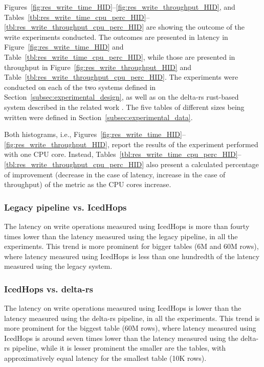 Figures~\ref{fig:res_write_time_HID}--\ref{fig:res_write_throughput_HID}, and Tables~\ref{tbl:res_write_time_cpu_perc_HID}--\ref{tbl:res_write_throughput_cpu_perc_HID} are showing the outcome of the write experiments conducted. The outcomes are presented in latency in Figure~\ref{fig:res_write_time_HID} and Table~\ref{tbl:res_write_time_cpu_perc_HID}, while those are presented in throughput in Figure~\ref{fig:res_write_throughput_HID} and Table~\ref{tbl:res_write_throughput_cpu_perc_HID}. The experiments were conducted on each of the two systems defined in Section~\ref{subsec:experimental_design}, as well as on the delta-rs rust-based system described in the related work \cite{manfrediReducingReadWrite2024}. The five tables of different sizes being written were defined in Section~\ref{subsec:experimental_data}.

Both histograms, i.e., Figures~\ref{fig:res_write_time_HID}--\ref{fig:res_write_throughput_HID}, report the results of the experiment performed with one \gls{CPU} core. Instead, Tables~\ref{tbl:res_write_time_cpu_perc_HID}--\ref{tbl:res_write_throughput_cpu_perc_HID} also present a calculated percentage of improvement (decrease in the case of latency, increase in the case of throughput) of the metric as the \gls{CPU} cores increase.

\subsubsection*{Legacy pipeline vs. IcedHops}
The latency on write operations measured using IcedHops is more than fourty times lower than the latency measured using the legacy pipeline, in all the experiments. This trend is more prominent for bigger tables (6M and 60M rows), where latency measured using IcedHops is less than one hundredth of the latency measured using the legacy system.

\subsubsection*{IcedHops vs. delta-rs}
The latency on write operations measured using IcedHops is lower than the latency measured using the delta-rs pipeline, in all the experiments. This trend is more prominent for the biggest table (60M rows), where latency measured using IcedHops is around seven times lower than the latency measured using the delta-rs pipeline, while it is lesser prominent the smaller are the tables, with approximatively equal latency for the smallest table (10K rows).

